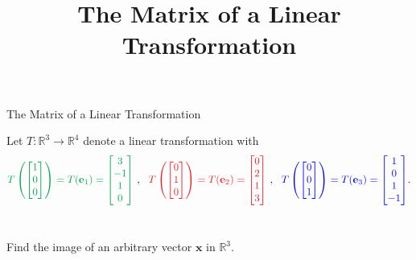 \documentclass[xcolor=dvipsnames,aspectratio=169,t]{beamer}
\title{The Matrix of a Linear Transformation}
\begin{document}
\maketitle

\begin{frame}{The Matrix of a Linear Transformation}

  Let $T: \mathbb{R}^3 \to \mathbb{R}^4$ denote a linear transformation with
  \[ \colorg{T \left( \begin{bmatrix} 1\\0\\0 \end{bmatrix} \right) = T(\mathbf{e}_1) = \begin{bmatrix} 3\\-1\\1\\0\end{bmatrix}}  \ , \ \ \colorr{T \left( \begin{bmatrix} 0\\1\\0 \end{bmatrix} \right) = T( \mathbf{e}_2) = \begin{bmatrix} 0\\2\\1\\3\end{bmatrix}} \ , \ \ \colorb{T \left( \begin{bmatrix} 0\\0\\1 \end{bmatrix} \right) = T(\mathbf{e}_3) = \begin{bmatrix} 1\\0\\1\\-1\end{bmatrix}} .\]\

  Find the image of an \alert{arbitrary vector $\mathbf{x}$} in  $\mathbb{R}^3$.


\end{frame}
\end{document}
